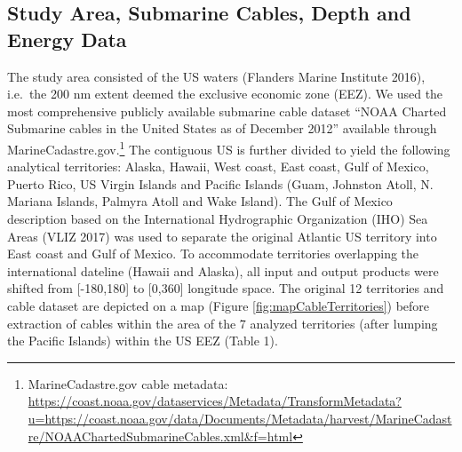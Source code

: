 \documentclass[]{article}
\let\rmarkdownfootnote\footnote%
\def\footnote{\protect\rmarkdownfootnote}
\begin{document}
\hypertarget{study-area-submarine-cables-depth-and-energy-data}{%
\subsection{Study Area, Submarine Cables, Depth and Energy
Data}\label{study-area-submarine-cables-depth-and-energy-data}}

The study area consisted of the US waters (Flanders Marine Institute
2016), i.e.~the 200 nm extent deemed the exclusive economic zone (EEZ).
We used the most comprehensive publicly available submarine cable
dataset ``NOAA Charted Submarine cables in the United States as of
December 2012'' available through MarineCadastre.gov.\footnote{MarineCadastre.gov
  cable metadata:
  \url{https://coast.noaa.gov/dataservices/Metadata/TransformMetadata?u=https://coast.noaa.gov/data/Documents/Metadata/harvest/MarineCadastre/NOAAChartedSubmarineCables.xml\&f=html}}
The contiguous US is further divided to yield the following analytical
territories: Alaska, Hawaii, West coast, East coast, Gulf of Mexico,
Puerto Rico, US Virgin Islands and Pacific Islands (Guam, Johnston
Atoll, N. Mariana Islands, Palmyra Atoll and Wake Island). The Gulf of
Mexico description based on the International Hydrographic Organization
(IHO) Sea Areas (VLIZ 2017) was used to separate the original Atlantic
US territory into East coast and Gulf of Mexico. To accommodate
territories overlapping the international dateline (Hawaii and Alaska),
all input and output products were shifted from {[}-180,180{]} to
{[}0,360{]} longitude space. The original 12 territories and cable
dataset are depicted on a map (Figure \ref{fig:mapCableTerritories})
before extraction of cables within the area of the 7 analyzed
territories (after lumping the Pacific Islands) within the US EEZ (Table
1).
\end{document}
